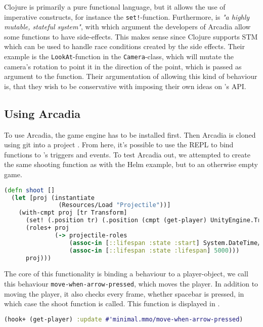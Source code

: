 Clojure is primarily a pure functional language, but it allows the use of imperative constructs, for instance the \texttt{set!}-function\cite{arcadia:usage}. Furthermore, \unityspace is \textit{"a highly mutable, stateful system"}, with which argument the developers of Arcadia allow some functions to have side-effects. This makes sense since Clojure supports \ac{STM} \cite{clojure2018transactions} which can be used to handle race conditions created by the side effects. Their example is the \texttt{LookAt}-function in the \texttt{Camera}-class, which will mutate the camera's rotation to point it in the direction of the point, which is passed as argument to the function. Their argumentation of allowing this kind of behaviour is, that they wish to be conservative with imposing their own ideas on \unity's \ac{API}.

\subsection{Using Arcadia}
To use Arcadia, the game engine \unityspace has to be installed first. Then Arcadia is cloned using git into a \unityspace project \cite{arcadia-test:github}.
From here, it's possible to use the \ac{REPL} to bind functions to \unity's triggers and events.
To test Arcadia out, we attempted to create the same shooting function as with the Helm example, but to an otherwise empty game.

\begin{lstlisting}[language=clojure,label={lst:clojure:shoot},caption={Arcadia Shoot}]
(defn shoot []
  (let [proj (instantiate
               (Resources/Load "Projectile"))] 
    (with-cmpt proj [tr Transform] 
      (set! (.position tr) (.position (cmpt (get-player) UnityEngine.Transform)))
      (roles+ proj
              (-> projectile-roles
                  (assoc-in [::lifespan :state :start] System.DateTime/Now)
                  (assoc-in [::lifespan :state :lifespan] 5000)))
      proj)))
\end{lstlisting}

The core of this functionality is binding a behaviour to a player-object, we call this behaviour \texttt{move-when-arrow-pressed}, which moves the player. In addition to moving the player, it also checks every frame, whether spacebar is pressed, in which case the shoot function is called. 
This function is displayed in .

\begin{lstlisting}[language=clojure,label={lst:clojure:repl},caption={Arcadia Shoot}]
(hook+ (get-player) :update #'minimal.mmo/move-when-arrow-pressed)
\end{lstlisting}

